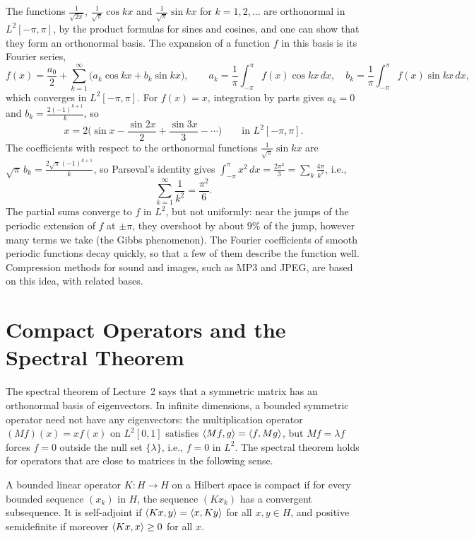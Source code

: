 \begin{example}\label{A-ex:fourier}
    The functions $\frac{1}{\sqrt{2\pi}}$, $\frac{1}{\sqrt{\pi}}\cos kx$ and $\frac{1}{\sqrt{\pi}}\sin kx$ for $k = 1, 2, \ldots$ are orthonormal in $L^2[-\pi, \pi]$, by the product formulas for sines and cosines, and one can show that they form an orthonormal basis. The expansion of a function $f$ in this basis is its Fourier series,
    \[f(x) = \frac{a_0}{2} + \sum_{k=1}^\infty \big(a_k\cos kx + b_k\sin kx\big), \qquad a_k = \frac{1}{\pi}\int_{-\pi}^\pi f(x)\cos kx\, dx, \quad b_k = \frac{1}{\pi}\int_{-\pi}^\pi f(x)\sin kx\, dx,\]
    which converges in $L^2[-\pi, \pi]$. For $f(x) = x$, integration by parts gives $a_k = 0$ and $b_k = \frac{2(-1)^{k+1}}{k}$, so
    \[x = 2\Big(\sin x - \frac{\sin 2x}{2} + \frac{\sin 3x}{3} - \cdots\Big) \qquad \text{in } L^2[-\pi, \pi].\]
    The coefficients with respect to the orthonormal functions $\frac{1}{\sqrt{\pi}}\sin kx$ are $\sqrt{\pi}\,b_k = \frac{2\sqrt{\pi}(-1)^{k+1}}{k}$, so Parseval's identity gives $\int_{-\pi}^\pi x^2\, dx = \frac{2\pi^3}{3} = \sum_k \frac{4\pi}{k^2}$, i.e.,
    \[\sum_{k=1}^\infty \frac{1}{k^2} = \frac{\pi^2}{6}.\]
    The partial sums converge to $f$ in $L^2$, but not uniformly: near the jumps of the periodic extension of $f$ at $\pm\pi$, they overshoot by about $9\%$ of the jump, however many terms we take (the Gibbs phenomenon). The Fourier coefficients of smooth periodic functions decay quickly, so that a few of them describe the function well. Compression methods for sound and images, such as MP3 and JPEG, are based on this idea, with related bases.
\end{example}

\section{Compact Operators and the Spectral Theorem}\label{A-sec:compact-operators}

The spectral theorem of Lecture~2 says that a symmetric matrix has an orthonormal basis of eigenvectors. In infinite dimensions, a bounded symmetric operator need not have any eigenvectors: the multiplication operator $(Mf)(x) = xf(x)$ on $L^2[0, 1]$ satisfies $\langle Mf, g \rangle = \langle f, Mg \rangle$, but $Mf = \lambda f$ forces $f = 0$ outside the null set $\{\lambda\}$, i.e., $f = 0$ in $L^2$. The spectral theorem holds for operators that are close to matrices in the following sense.

\begin{definition}\label{A-def:compact-operator}
    A bounded linear operator $K: H \to H$ on a Hilbert space is compact if for every bounded sequence $(x_k)$ in $H$, the sequence $(Kx_k)$ has a convergent subsequence. It is self-adjoint if $\langle Kx, y \rangle = \langle x, Ky \rangle$ for all $x, y \in H$, and positive semidefinite if moreover $\langle Kx, x \rangle \geq 0$ for all $x$.
\end{definition}

